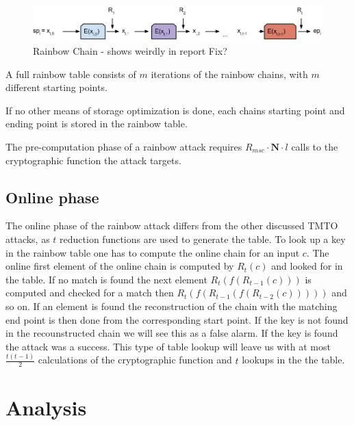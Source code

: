 \begin{figure}[H]
  \centering
  \includegraphics[scale=0.4]{figures/rainbowchain.png}
  \caption{Rainbow Chain - shows weirdly in report Fix?}
  \label{fig:rainbowchain}
\end{figure}

A full rainbow table consists of $m$ iterations of the rainbow chains,
with $m$ different starting points.

If no other means of storage optimization is done, each chains
starting point and ending point is stored in the rainbow table.

The pre-computation phase of a rainbow attack requires 
$R_{msc} \cdot \textbf{N} \cdot l$ calls to the cryptographic function the attack targets. 

\subsection{Online phase}
\label{sec:onlinerb}

The online phase of the rainbow attack differs from the other
discussed TMTO attacks, as $t$ reduction functions are used to
generate the table. To look up a key in the rainbow table one has to
compute the online chain for an input $c$. The online first element of
the online chain is computed by $R_t(c)$ and looked for in the
table. If no match is found the next element $R_t(f(R_{t-1}(c)))$ is
computed and checked for a match then $R_t(f(R_{t-1}(f(R_{t-2}(c)))))$
and so on. If an element is found the reconstruction of the chain with
the matching end point is then done from the corresponding start
point. If the key is not found in the recounstructed chain we will see
this as a false alarm. If the key is found the attack was a
success. This type of table lookup will leave us with at most
$\frac{t(t - 1)}{2}$ calculations of the cryptographic function and
$t$ lookups in the the table.

\section{Analysis}






